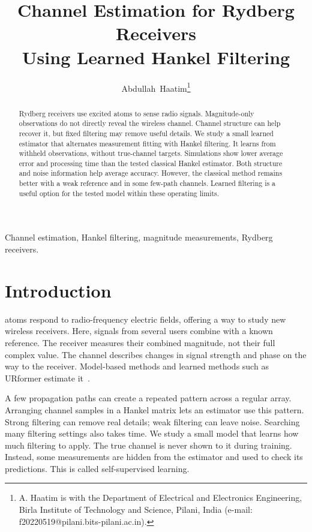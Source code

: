 \documentclass[journal]{IEEEtran}
\begin{document}
\title{Channel Estimation for Rydberg Receivers\\Using Learned Hankel Filtering}
\author{Abdullah~Haatim\thanks{A. Haatim is with the Department of Electrical and Electronics Engineering, Birla Institute of Technology and Science, Pilani, India (e-mail: f20220519@pilani.bits-pilani.ac.in).}}
\maketitle
\begin{abstract}
Rydberg receivers use excited atoms to sense radio signals. Magnitude-only
observations do not directly reveal the wireless channel. Channel structure
can help recover it, but fixed filtering may remove useful details. We
study a small learned estimator that alternates measurement fitting with
Hankel filtering. It learns from withheld observations, without true-channel
targets. Simulations show lower average error and processing time than
the tested classical Hankel estimator. Both structure and noise information
help average accuracy. However, the classical method remains better with
a weak reference and in some few-path channels. Learned filtering is a
useful option for the tested model within these operating limits.
\end{abstract}
\begin{IEEEkeywords}
Channel estimation, Hankel filtering, magnitude measurements, Rydberg receivers.
\end{IEEEkeywords}

\section{Introduction}
 atoms respond to radio-frequency electric fields,
offering a way to study new wireless receivers. Here, signals from several
users combine with a known reference. The receiver measures their combined
magnitude, not their full complex value. The channel describes changes in
signal strength and phase on the way to the receiver. Model-based methods
and learned methods such as URformer estimate it~\cite{xu2025,xiao2026}.

A few propagation paths can create a repeated pattern across a regular
array. Arranging channel samples in a Hankel matrix lets an estimator use
this pattern. Strong filtering can remove real details; weak filtering can
leave noise. Searching many filtering settings also takes time. We study a
small model that learns how much filtering to apply. The true channel is
never shown to it during training. Instead, some measurements are hidden
from the estimator and used to check its predictions. This is called
self-supervised learning.
\end{document}
